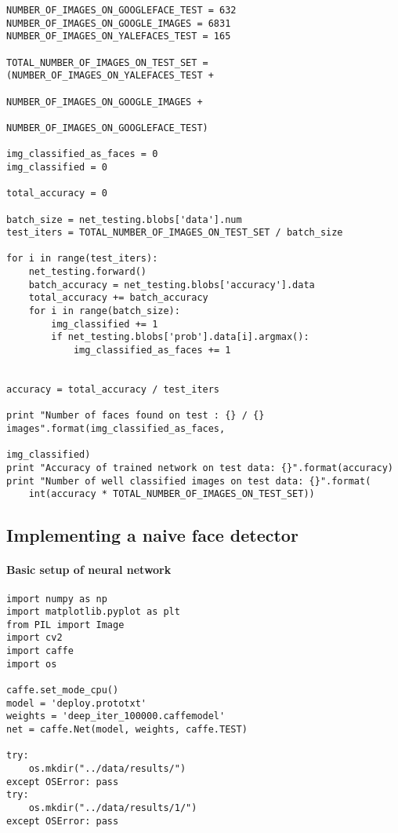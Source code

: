 \documentclass[french]{article}
\begin{document}
\begin{verbatim}
NUMBER_OF_IMAGES_ON_GOOGLEFACE_TEST = 632
NUMBER_OF_IMAGES_ON_GOOGLE_IMAGES = 6831
NUMBER_OF_IMAGES_ON_YALEFACES_TEST = 165

TOTAL_NUMBER_OF_IMAGES_ON_TEST_SET = (NUMBER_OF_IMAGES_ON_YALEFACES_TEST +
                                      NUMBER_OF_IMAGES_ON_GOOGLE_IMAGES +
                                      NUMBER_OF_IMAGES_ON_GOOGLEFACE_TEST)

img_classified_as_faces = 0
img_classified = 0

total_accuracy = 0

batch_size = net_testing.blobs['data'].num
test_iters = TOTAL_NUMBER_OF_IMAGES_ON_TEST_SET / batch_size

for i in range(test_iters):
    net_testing.forward()
    batch_accuracy = net_testing.blobs['accuracy'].data
    total_accuracy += batch_accuracy
    for i in range(batch_size):
        img_classified += 1
        if net_testing.blobs['prob'].data[i].argmax():
            img_classified_as_faces += 1
            

accuracy = total_accuracy / test_iters

print "Number of faces found on test : {} / {} images".format(img_classified_as_faces,
                                                              img_classified)
print "Accuracy of trained network on test data: {}".format(accuracy)
print "Number of well classified images on test data: {}".format(
    int(accuracy * TOTAL_NUMBER_OF_IMAGES_ON_TEST_SET))
\end{verbatim}

\subsection{Implementing a naive face detector}

\paragraph{Basic setup of neural network}

\begin{verbatim}
import numpy as np
import matplotlib.pyplot as plt
from PIL import Image
import cv2
import caffe
import os

caffe.set_mode_cpu()
model = 'deploy.prototxt'
weights = 'deep_iter_100000.caffemodel'
net = caffe.Net(model, weights, caffe.TEST)

try:
    os.mkdir("../data/results/")
except OSError: pass
try:
    os.mkdir("../data/results/1/")
except OSError: pass
\end{verbatim}
\end{document}
